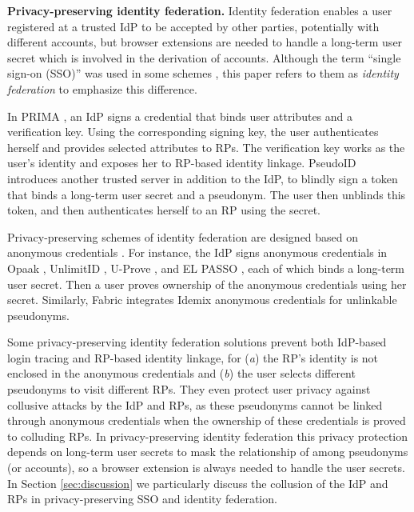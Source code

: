 \noindent\textbf{Privacy-preserving identity federation.}
Identity federation enables a user registered at a trusted IdP to be accepted by other parties, potentially with different accounts,
but %
browser extensions are needed to handle a long-term user secret
which is involved in the derivation of accounts.
Although the term ``single sign-on (SSO)'' was used in some schemes \cite{PseudoID, Opaak, ELPASSO, WangWS13, HanCSTW18, HanCSTWW20}, this paper refers to them as \emph{identity federation} to emphasize this difference.

In PRIMA \cite{prima}, an IdP signs a credential
that binds user attributes and  a verification key.
Using the corresponding signing key, the user authenticates herself and provides selected attributes to RPs. The verification key works as the user's identity and exposes her to RP-based identity linkage.
PseudoID \cite{PseudoID} introduces another trusted server in addition to the IdP,
 to blindly sign \cite{blind-sign}
a token that binds a long-term user secret and a pseudonym.
The user then unblinds this token,
    and then authenticates herself to an RP using the secret.

Privacy-preserving schemes of identity federation are designed based on anonymous credentials \cite{anon-credential-2001, idemix, anon-credential}.
For instance, the IdP signs anonymous credentials in Opaak \cite{Opaak}, UnlimitID \cite{UnlimitID}, U-Prove \cite{uprov}, and EL PASSO \cite{ELPASSO}, each of which binds a long-term user secret. %
Then a user proves ownership of the anonymous credentials using her secret.
Similarly, Fabric \cite{hyperledge-idemix} integrates Idemix anonymous credentials \cite{idemix} for unlinkable pseudonyms. %


Some privacy-preserving identity federation solutions \cite{PseudoID,ELPASSO,UnlimitID,Opaak,uprov,hyperledge-idemix} prevent both IdP-based login tracing and RP-based identity linkage, for (\emph{a}) the RP's identity is not enclosed in the anonymous credentials and (\emph{b}) the user selects different pseudonyms to visit different RPs.
They even protect user privacy against collusive attacks by the IdP and RPs, as these pseudonyms cannot be linked through anonymous credentials \cite{anon-credential-2001, idemix, anon-credential} when the ownership of these credentials is proved to colluding RPs. %
In privacy-preserving identity federation
this privacy protection depends on long-term user secrets to mask the relationship of among pseudonyms (or accounts),
        so a browser extension is always needed to handle the user secrets. 
In Section \ref{sec:discussion}
we particularly discuss the collusion of the IdP and RPs in privacy-preserving SSO and identity federation.

